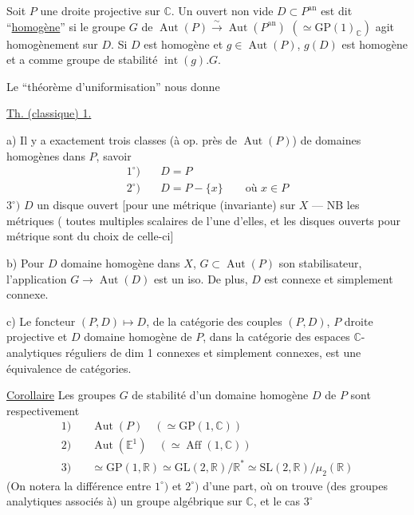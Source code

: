 Soit $P$ une droite projective sur $\mathbb C$. Un ouvert non vide $D\subset P^{\mathrm{an}}$ est dit ``\uline{homogène}'' si le groupe $G$ de $\operatorname{Aut}(P)\xrightarrow{\sim}\operatorname{Aut}(P^{\mathrm{an}})$ $(\simeq\mathrm{GP}(1)_{\mathbb C})$ agit homogènement sur $D$. Si $D$ est homogène et $g\in\operatorname{Aut}(P)$, $g(D)$ est homogène et a comme groupe de stabilité $\operatorname{int}(g).G$.

Le ``théorème d'uniformisation'' nous donne

\uline{Th. (classique) 1.}

a) Il y a exactement trois classes (à op. près de $\operatorname{Aut}(P)$) de domaines homogènes dans $P$, savoir
\[
\begin{aligned}
1^\circ)\quad&D=P\\
2^\circ)\quad&D=P-\{x\}\qquad\text{où }x\in P
\end{aligned}
\]
$3^\circ)$ $D$ un disque ouvert [pour une métrique  (invariante) sur $X$ --- NB les métriques  ( toutes multiples scalaires de l'une d'elles, et les disques ouverts pour  métrique sont  du choix de celle-ci]

b) Pour $D$ domaine homogène dans $X$, $G\subset\operatorname{Aut}(P)$ son stabilisateur, l'application $G\longrightarrow\operatorname{Aut}(D)$ est un iso. De plus, $D$ est connexe et simplement connexe.

c) Le foncteur $(P,D)\longmapsto D$, de la catégorie  des couples $(P,D)$, $P$ droite projective et $D$ domaine homogène de $P$, dans la catégorie  des espaces $\mathbb C$-analytiques réguliers de dim 1 connexes et simplement connexes, est une équivalence de catégories.

\uline{Corollaire} Les groupes $G$ de stabilité d'un domaine homogène $D$ de $P$ sont respectivement
\[
\begin{aligned}
1)\quad&\operatorname{Aut}(P)\quad(\simeq\mathrm{GP}(1,\mathbb C))\\
2)\quad&\operatorname{Aut}(\mathbb E^1)\quad(\simeq\operatorname{Aff}(1,\mathbb C))\\
3)\quad&\simeq\mathrm{GP}(1,\mathbb R)\simeq\mathrm{GL}(2,\mathbb R)/\mathbb R^*\simeq\mathrm{SL}(2,\mathbb R)/\mu_2(\mathbb R)
\end{aligned}
\]
(On notera la différence entre $1^\circ)$ et $2^\circ)$ d'une part, où on trouve (des groupes analytiques associés à) un groupe algébrique sur $\mathbb C$, et le cas $3^\circ$
